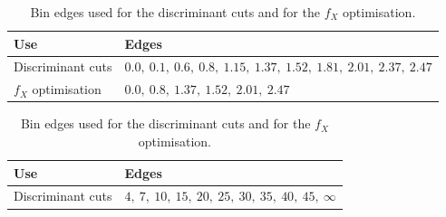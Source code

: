 \begin{table}[htbp]
  \centering
  \caption{Bin edges used for the discriminant cuts and for the $f_X$ optimisation.}
  \footnotesize
  \setlength{\tabcolsep}{5pt}
  \renewcommand{\arraystretch}{1.1}

  \begin{subtable}[t]{\linewidth}
    \centering
    \vspace{2pt}
    \begin{tabular}{@{}ll@{}}
      \toprule
      \textbf{Use} & \textbf{Edges} \\
      \midrule
      Discriminant cuts &
      $0.0,\ 0.1,\ 0.6,\ 0.8,\ 1.15,\ 1.37,\ 1.52,\ 1.81,\ 2.01,\ 2.37,\ 2.47$ \\
      $f_X$ optimisation &
      $0.0,\ 0.8,\ 1.37,\ 1.52,\ 2.01,\ 2.47$ \\
      \bottomrule
    \end{tabular}
  \end{subtable}

  \vspace{0.4cm} %

  \begin{subtable}[t]{\linewidth}
    \centering
    \vspace{2pt}
    \begin{tabular}{@{}ll@{}}
      \toprule
      \textbf{Use} & \textbf{Edges} \\
      \midrule
      Discriminant cuts &
      $4,\ 7,\ 10,\ 15,\ 20,\ 25,\ 30,\ 35,\ 40,\ 45,\ \infty$ \\
      \bottomrule
    \end{tabular}
  \end{subtable}
  \label{tune:binning}
\end{table}

